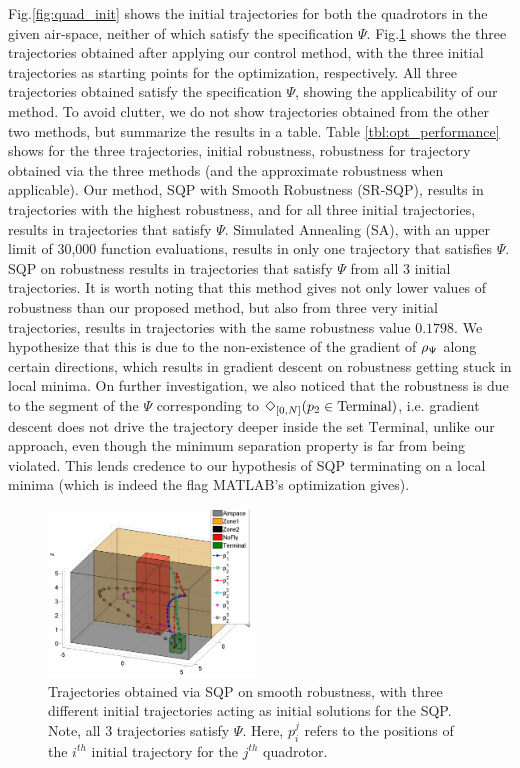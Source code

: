 Fig.\ref{fig:quad_init} shows the initial trajectories for both the quadrotors in the given air-space, neither of which satisfy the specification $\Psi$. Fig.\ref{fig:quad_ssqp} shows the three trajectories obtained after applying our control method, with the three initial trajectories as starting points for the optimization, respectively. All three trajectories obtained satisfy the specification $\Psi$, showing the applicability of our method. To avoid clutter, we do not show trajectories obtained from the other two methods, but summarize the results in a table. Table \ref{tbl:opt_performance} shows for the three trajectories, initial robustness, robustness for trajectory obtained via the three methods (and the approximate robustness when applicable). Our method, SQP with Smooth Robustness (SR-SQP), results in trajectories with the highest robustness, and for all three initial trajectories, results in trajectories that satisfy $\Psi$. Simulated Annealing (SA), with an upper limit of 30,000 function evaluations, results in only one trajectory that satisfies $\Psi$. SQP on robustness results in trajectories that satisfy $\Psi$ from all 3 initial trajectories. It is worth noting that this method gives not only lower values of robustness than our proposed method, but also from three very initial trajectories, results in trajectories with the same robustness value $0.1798$. We hypothesize that this is due to the non-existence of the gradient of $\rho_{\Psi}$ along certain directions, which results in gradient descent on robustness getting stuck in local minima. On further investigation, we also noticed that the robustness is due to the segment of the $\Psi$ corresponding to $\Diamond_{[0,N]}(p_2 \in \text{Terminal})$, i.e. gradient descent does not drive the trajectory deeper inside the set $\text{Terminal}$, unlike our approach, even though the minimum separation property is far from being violated. This lends credence to our hypothesis of SQP terminating on a local minima (which is indeed the flag MATLAB's optimization gives).


\begin{figure}[t]
\centering
\includegraphics[width=0.49\textwidth]{figures/QuadTrajs_scissored}
\caption{ Trajectories obtained via SQP on smooth robustness, with three different initial trajectories acting as initial solutions for the SQP. Note, all 3 trajectories satisfy $\Psi$. Here, $p_{i}^j$ refers to the positions of the $i^{th}$ initial trajectory for the $j^{th}$ quadrotor.}
\label{fig:quad_ssqp}
\end{figure}

